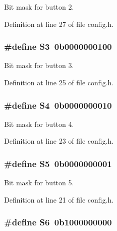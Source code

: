 Bit mask for button 2. 



Definition at line 27 of file config.\+h.

\subsubsection[{\texorpdfstring{S3}{S3}}]{\setlength{\rightskip}{0pt plus 5cm}\#define S3~0b0000000100}\hypertarget{group__buttons_gab29872af8ce9dc9463b7f7ecfbea02ae}{}\label{group__buttons_gab29872af8ce9dc9463b7f7ecfbea02ae}


Bit mask for button 3. 



Definition at line 25 of file config.\+h.

\subsubsection[{\texorpdfstring{S4}{S4}}]{\setlength{\rightskip}{0pt plus 5cm}\#define S4~0b0000000010}\hypertarget{group__buttons_gac6dd50ea82e237280daf26bd9b562ba9}{}\label{group__buttons_gac6dd50ea82e237280daf26bd9b562ba9}


Bit mask for button 4. 



Definition at line 23 of file config.\+h.

\subsubsection[{\texorpdfstring{S5}{S5}}]{\setlength{\rightskip}{0pt plus 5cm}\#define S5~0b0000000001}\hypertarget{group__buttons_ga0dae655e00097db2f5737cef9f1fe1e6}{}\label{group__buttons_ga0dae655e00097db2f5737cef9f1fe1e6}


Bit mask for button 5. 



Definition at line 21 of file config.\+h.

\subsubsection[{\texorpdfstring{S6}{S6}}]{\setlength{\rightskip}{0pt plus 5cm}\#define S6~0b1000000000}\hypertarget{group__buttons_gab86bfbee3d71830e88c61a3f8d5aebf4}{}\label{group__buttons_gab86bfbee3d71830e88c61a3f8d5aebf4}


